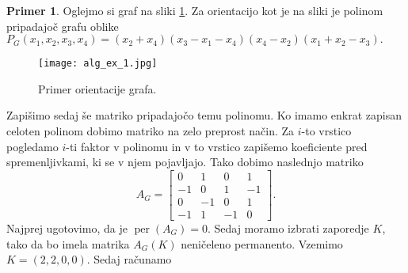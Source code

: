 \documentclass[12pt,a4paper,twoside]{article}
\theoremstyle{definition} %
\newtheorem{primer}[definicija]{Primer}
\theoremstyle{plain} %
\numberwithin{equation}{section}  %
\DeclareMathOperator{\per}{per}
\begin{document}
\begin{primer}

Oglejmo si graf na sliki \ref{ex_1}. Za orientacijo kot je na sliki je polinom pripadajoč grafu oblike $P_G(x_1, x_2, x_3, x_4) =(x_2 + x_4)(x_3 - x_1 - x_4)(x_4 - x_2)(x_1 + x_2 - x_3). $
 \begin{figure}[h!]
\caption{Primer orientacije grafa.}
\label{ex_1}
\centering
    \texttt{[image: alg\_ex\_1.jpg]}
    \end{figure}
Zapišimo sedaj še matriko pripadajočo temu polinomu. Ko imamo enkrat zapisan celoten polinom dobimo matriko na zelo preprost način. Za $i$-to vrstico pogledamo $i$-ti faktor v polinomu in v to vrstico zapišemo koeficiente pred spremenljivkami, ki se v njem pojavljajo. Tako dobimo naslednjo matriko 
$$ A_G = \left[ \begin{matrix} 0 & 1 & 0 & 1 \\ -1 & 0 & 1 & -1 \\ 0 & -1 & 0 & 1 \\ -1 & 1 & -1 & 0 \end{matrix} \right] .$$
 Najprej ugotovimo, da je $\per(A_G) = 0$. Sedaj moramo izbrati zaporedje $K$, tako da bo imela matrika $A_G(K)$ neničeleno permanento. Vzemimo $K = (2,2,0,0)$. Sedaj računamo 


\end{primer}
\end{document}
